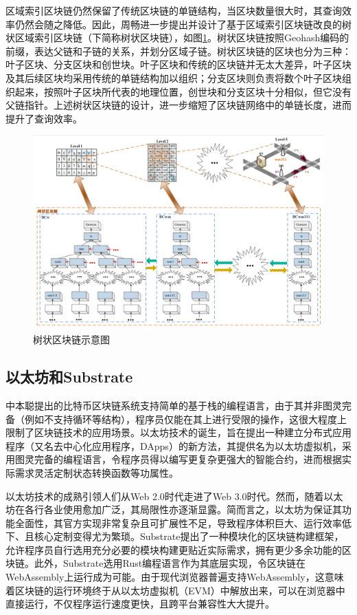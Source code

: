 区域索引区块链仍然保留了传统区块链的单链结构，当区块数量很大时，其查询效率仍然会随之降低。因此，周畅进一步提出并设计了基于区域索引区块链改良的树状区域索引区块链（下简称树状区块链），如图\ref{树状链区块示意图}。树状区块链按照Geohash编码的前缀，表达父链和子链的关系，并划分区域子链。树状区块链的区块也分为三种：叶子区块、分支区块和创世块。叶子区块和传统的区块链并无太大差异，叶子区块及其后续区块均采用传统的单链结构加以组织；分支区块则负责将数个叶子区块组织起来，按照叶子区块所代表的地理位置，创世块和分支区块十分相似，但它没有父链指针。上述树状区块链的设计，进一步缩短了区块链网络中的单链长度，进而提升了查询效率。

\begin{figure}[htbp]
  \centering
  \includegraphics[width=\textwidth]{images/树状链区块示意图.png}
  \caption{树状区块链示意图}\label{树状链区块示意图} %
\end{figure}

\subsection{以太坊和Substrate}

中本聪提出的比特币区块链系统支持简单的基于栈的编程语言，由于其并非图灵完备（例如不支持循环等结构），程序员仅能在其上进行受限的操作，这很大程度上限制了区块链技术的应用场景。以太坊\cite{ethereumWhitePaper}技术的诞生，旨在提出一种建立分布式应用程序（又名去中心化应用程序，DApps）的新方法，其提供名为以太坊虚拟机\cite{MA2021102565}，采用图灵完备的编程语言，令程序员得以编写更复杂更强大的智能合约，进而根据实际需求灵活定制状态转换函数等功属性。

以太坊技术的成熟引领人们从Web 2.0时代\cite{whatIsWeb2}走进了Web 3.0时代\cite{4755170}。然而，随着以太坊在各行各业使用愈加广泛，其局限性亦逐渐显露。简而言之，以太坊为保证其功能全面性，其官方实现非常复杂且可扩展性不足，导致程序体积巨大、运行效率低下、且核心定制变得尤为繁琐。Substrate提出了一种模块化的区块链构建框架，允许程序员自行选用充分必要的模块构建更贴近实际需求，拥有更少多余功能的区块链。此外，Substrate选用Rust编程语言\cite{rust}作为其底层实现，令区块链在WebAssembly上运行成为可能。由于现代浏览器普遍支持WebAssembly，这意味着区块链的运行环境终于从以太坊虚拟机（EVM）中解放出来，可以在浏览器中直接运行，不仅程序运行速度更快，且跨平台兼容性大大提升。

